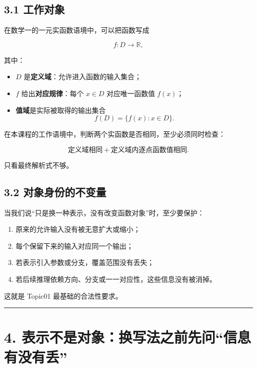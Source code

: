 \documentclass[11pt,a4paper]{ctexart}
\providecommand{\tightlist}{}
\begin{document}
\subsection{3.1 工作对象}\label{ux5de5ux4f5cux5bf9ux8c61}

在数学一的一元实函数语境中，可以把函数写成

\[
f:D\to\mathbb R,
\]

其中：

\begin{itemize}
\tightlist
\item
  \(D\) 是\textbf{定义域}：允许进入函数的输入集合；
\item
  \(f\) 给出\textbf{对应规律}：每个 \(x\in D\) 对应唯一函数值 \(f(x)\)；
\item
  \textbf{值域}是实际被取得的输出集合 \[
  f(D)=\{f(x):x\in D\}.
  \]
\end{itemize}

在本课程的工作语境中，判断两个实函数是否相同，至少必须同时检查：

\[
\boxed{\text{定义域相同}+\text{定义域内逐点函数值相同}.}
\]

只看最终解析式不够。

\subsection{3.2
对象身份的不变量}\label{ux5bf9ux8c61ux8eabux4efdux7684ux4e0dux53d8ux91cf}

当我们说``只是换一种表示，没有改变函数对象''时，至少要保护：

\begin{enumerate}
\def\labelenumi{\arabic{enumi}.}
\tightlist
\item
  原来的允许输入没有被无意扩大或缩小；
\item
  每个保留下来的输入对应同一个输出；
\item
  若表示引入参数或分支，覆盖范围没有丢失；
\item
  若后续推理依赖方向、分支或一一对应性，这些信息没有被消掉。
\end{enumerate}

这就是 Topic01 最基础的合法性要求。

\begin{center}\rule{0.5\linewidth}{0.5pt}\end{center}

\section{4.
表示不是对象：换写法之前先问``信息有没有丢''}\label{ux8868ux793aux4e0dux662fux5bf9ux8c61ux6362ux5199ux6cd5ux4e4bux524dux5148ux95eeux4fe1ux606fux6709ux6ca1ux6709ux4e22}
\end{document}
